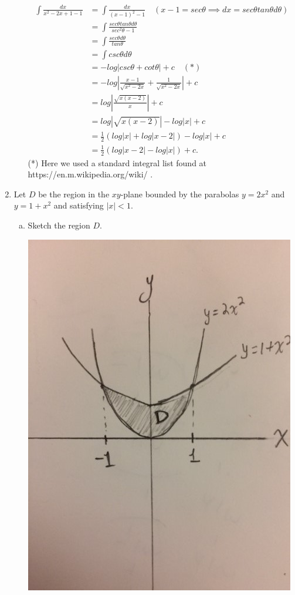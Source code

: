 \documentclass[letterpaper,12pt,fleqn]{article}
\begin{document}
\begin{enumerate}
\begin{enumerate}[a)]
\begin{align*}
\int \frac{dx}{x^2-2x+1-1} &= \int \frac{dx}{(x-1)^2 - 1} \quad \left(x-1 = sec\theta \implies dx = sec\theta tan\theta d\theta\right) \\
&= \int \frac{sec\theta tan\theta d\theta}{sec^2 \theta - 1} \\
&= \int \frac{sec\theta d\theta}{tan\theta} \\
&= \int csc\theta d\theta \\
&= -log|csc\theta + cot \theta| +c \quad(*) \\
&= -log \left|\frac{x-1}{\sqrt{x^2-2x}} +\frac{1}{\sqrt{x^2-2x}}\right| + c \\
&= log \left|\frac{\sqrt{x(x-2)}}{x} \right| + c \\
&= log|\sqrt{x(x-2)}| - log|x| + c \\
&= \frac{1}{2}(log|x| + log|x-2|) - log|x| + c \\
&= \frac{1}{2}(log|x-2| - log|x|) + c.
\end{align*}
(*) Here we used a standard integral list found at https://en.m.wikipedia.org/wiki/ \;.
\end{enumerate}

\vspace{2em}


\item Let $D$ be the region in the $xy$-plane bounded by the parabolas $y = 2x^{2}$ and $y = 1 + x^{2}$ and satisfying $|x| < 1$.

\begin{enumerate}[a)]
\item Sketch the region $D$.

\includegraphics[scale=0.25]{Region}


\end{enumerate}
\end{enumerate}
\end{document}
